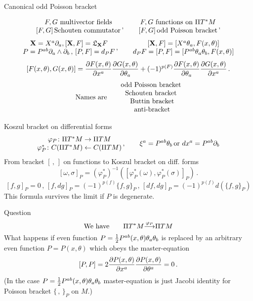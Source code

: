 \documentclass{beamer}
\def\s {{\sigma}}
\def\w {{\omega}}
\def\p{\partial}
\def\p {\partial}
\def \X   {{\bf X}}
\begin{document}
\begin{frame}{Canonical odd Poisson bracket} 

           $$
         \begin{matrix}
\hbox{$F,G$ multivector fields}\cr
 [F,G]\, \hbox{Schouten commutator}\cr 
  \end{matrix}\,,
      \qquad
         \begin{matrix}
\hbox{$F,G$ functions on $\Pi T^*M$}\cr
 [F,G]\, \hbox{odd Poisson bracket}\cr 
  \end{matrix}\,,
 $$
       $$
     \begin{matrix}
\X=X^a\p_a, [\X, F]=\mathfrak{L}_\X F\cr
  P=P^{ab}\p_a\wedge \p_b\,,\,
      [P,F]=d_P F
      \end{matrix}\,,\qquad
         \begin{matrix}
[\X, F]=[X^a\theta_a, F(x,\theta)]\cr
  d_PF=[P,F]=[P^{ab}\theta_a\theta_b, F(x,\theta)]\cr
      \end{matrix}
        $$
       $$
  \left[F(x,\theta),G(x,\theta)\right]=
     {\p F(x,\theta)\over \p x^a}
     {\p G(x,\theta)\over \p \theta_a}
         +(-1)^{p(F)}
     {\p F(x,\theta)\over \p \theta_a}
     {\p G(x,\theta)\over \p x^a}\,.
       $$
               $$
       \hbox{Names are}\quad
            \begin{matrix}
      &\hbox{odd Poisson bracket}\cr
      &\hbox{Schouten bracket}\cr
      & \hbox{ Buttin bracket}\cr
       &\hbox{ anti-bracket}\cr
           \end{matrix}
               $$
      
\end{frame}
\begin{frame}{Koszul bracket on differential forms}
       $$
      \begin{matrix}
        \varphi_P\colon \Pi T^*M
           \rightarrow \Pi TM\cr
        \varphi_P^*\colon   C(\Pi T^*M)
                 \leftarrow C(\Pi TM)\cr
         \end{matrix}\,,
            \qquad
      \xi^a=P^{ab}\theta_b\,{\rm or}\,\, dx^a=P^{ab}\p_b
       $$
From bracket $[\,,\,]$ on functions  
to Koszul bracket on diff. forms
       $$
     [\w,\s]_P=({\varphi_P^*})^{-1}
   \left(\left[\varphi_P^*(\w),\varphi_P^*(\s)\right]_P\right)\,.
       $$
       $$
 [f,g]_P=0\,,\,[f,dg]_P=(-1)^{p(f)}\{f,g\}_P\,,\,
      [df,dg]_P=(-1)^{p(f)}d\left(\{f,g\}_P\right)
      $$
 This formula survives the limit if $P$ is degenerate.
\end{frame}

\begin{frame}{Question}
       $$
\hbox{We have}\qquad  \Pi T^*M
 {\buildrel \varphi_P\over\longrightarrow} \Pi TM
       $$
What happens if 
even function $P={1\over 2}P^{ab}(x,\theta)\theta_a\theta_b$ 
is replaced by an arbitrary even function
   $P=P(x,\theta)$ which obeys the 
master-equation
          $$
[P,P]=2{\p P(x,\theta)\over \p x^a}{\p P(x,\theta)\over \p \theta^a}=0\,.
          $$  
(In the case $P={1\over 2}P^{ab}(x,\theta)\theta_a\theta_b$
master-equation is just Jacobi identity for Poisson bracket 
$\{\,,\,\}_P$
on $M$.) 
\end{frame}
\end{document}
